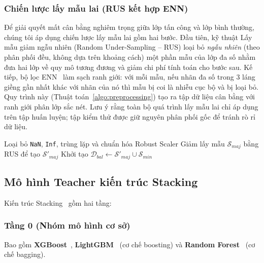\subsubsection{Chiến lược lấy mẫu lai (RUS kết hợp ENN)}
Để giải quyết mất cân bằng nghiêm trọng giữa lớp tấn công và lớp bình thường, chúng tôi áp dụng chiến lược lấy mẫu lai gồm hai bước. Đầu tiên, kỹ thuật Lấy mẫu giảm ngẫu nhiên (Random Under-Sampling -- RUS) loại bỏ \emph{ngẫu nhiên} (theo phân phối đều, không dựa trên khoảng cách) một phần mẫu của lớp đa số nhằm đưa hai lớp về quy mô tương đương và giảm chi phí tính toán cho bước sau. Kế tiếp, bộ lọc ENN~\cite{wilson1972asymptotic} làm sạch ranh giới: với mỗi mẫu, nếu nhãn đa số trong 3 láng giềng gần nhất khác với nhãn của nó thì mẫu bị coi là nhiễu cục bộ và bị loại bỏ. Quy trình này (Thuật toán~\ref{algo:preprocessing}) tạo ra tập dữ liệu cân bằng với ranh giới phân lớp sắc nét. Lưu ý rằng toàn bộ quá trình lấy mẫu lai chỉ áp dụng trên tập huấn luyện; tập kiểm thử được giữ nguyên phân phối gốc để tránh rò rỉ dữ liệu.

\begin{algorithm}[!t]
\SetAlgoLined
{}
Loại bỏ \texttt{NaN}, \texttt{Inf}, trùng lặp và chuẩn hóa Robust Scaler\;
Giảm lấy mẫu $\mathcal{S}_{maj}$ bằng RUS để tạo $\mathcal{S}'_{maj}$\;
Khởi tạo $\mathcal{D}_{bal} \leftarrow \mathcal{S}'_{maj} \cup \mathcal{S}_{min}$\;
\caption{Tiền xử lý và lấy mẫu lai (RUS + ENN)}
\label{algo:preprocessing}
\end{algorithm}

\subsection{Mô hình Teacher kiến trúc Stacking}
Kiến trúc Stacking~\cite{wolpert1992stacked} gồm hai tầng:
\subsubsection{Tầng 0 (Nhóm mô hình cơ sở)} Bao gồm \textbf{XGBoost}~\cite{chen2016xgboost}, \textbf{LightGBM}~\cite{ke2017lightgbm} (cơ chế boosting) và \textbf{Random Forest}~\cite{breiman2001random} (cơ chế bagging).

